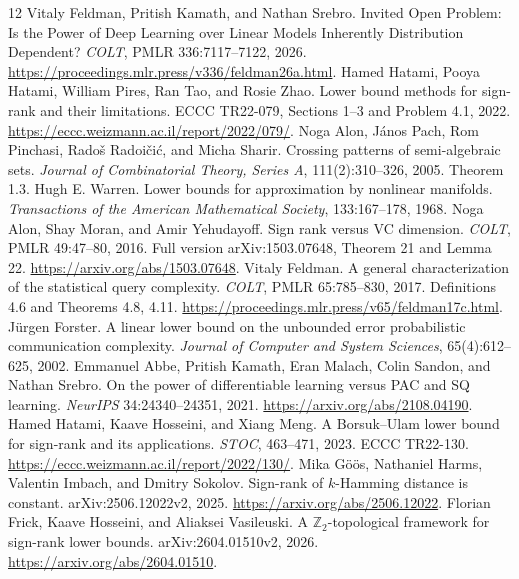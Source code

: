 \documentclass[11pt]{article}
\newcommand{\1}{\mathbf 1}
\begin{document}
\begin{thebibliography}{12}
 Vitaly Feldman, Pritish Kamath, and Nathan Srebro. Invited Open Problem: Is the Power of Deep Learning over Linear Models Inherently Distribution Dependent? \emph{COLT}, PMLR 336:7117--7122, 2026. \url{https://proceedings.mlr.press/v336/feldman26a.html}.
 Hamed Hatami, Pooya Hatami, William Pires, Ran Tao, and Rosie Zhao. Lower bound methods for sign-rank and their limitations. ECCC TR22-079, Sections 1--3 and Problem 4.1, 2022. \url{https://eccc.weizmann.ac.il/report/2022/079/}.
 Noga Alon, J\'anos Pach, Rom Pinchasi, Rado\v{s} Radoi\v{c}i\'c, and Micha Sharir. Crossing patterns of semi-algebraic sets. \emph{Journal of Combinatorial Theory, Series A}, 111(2):310--326, 2005. Theorem 1.3.
 Hugh E. Warren. Lower bounds for approximation by nonlinear manifolds. \emph{Transactions of the American Mathematical Society}, 133:167--178, 1968.
 Noga Alon, Shay Moran, and Amir Yehudayoff. Sign rank versus VC dimension. \emph{COLT}, PMLR 49:47--80, 2016. Full version arXiv:1503.07648, Theorem 21 and Lemma 22. \url{https://arxiv.org/abs/1503.07648}.
 Vitaly Feldman. A general characterization of the statistical query complexity. \emph{COLT}, PMLR 65:785--830, 2017. Definitions 4.6 and Theorems 4.8, 4.11. \url{https://proceedings.mlr.press/v65/feldman17c.html}.
 J\"urgen Forster. A linear lower bound on the unbounded error probabilistic communication complexity. \emph{Journal of Computer and System Sciences}, 65(4):612--625, 2002.
 Emmanuel Abbe, Pritish Kamath, Eran Malach, Colin Sandon, and Nathan Srebro. On the power of differentiable learning versus PAC and SQ learning. \emph{NeurIPS} 34:24340--24351, 2021. \url{https://arxiv.org/abs/2108.04190}.
 Hamed Hatami, Kaave Hosseini, and Xiang Meng. A Borsuk--Ulam lower bound for sign-rank and its applications. \emph{STOC}, 463--471, 2023. ECCC TR22-130. \url{https://eccc.weizmann.ac.il/report/2022/130/}.
 Mika G\"o\"os, Nathaniel Harms, Valentin Imbach, and Dmitry Sokolov. Sign-rank of $k$-Hamming distance is constant. arXiv:2506.12022v2, 2025. \url{https://arxiv.org/abs/2506.12022}.
 Florian Frick, Kaave Hosseini, and Aliaksei Vasileuski. A $\mathbb Z_2$-topological framework for sign-rank lower bounds. arXiv:2604.01510v2, 2026. \url{https://arxiv.org/abs/2604.01510}.
\end{thebibliography}
\end{document}
